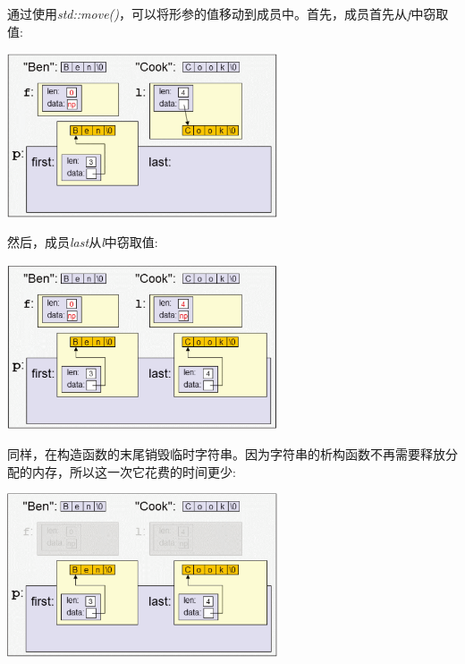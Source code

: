 通过使用\textit{std::move()}，可以将形参的值移动到成员中。首先，成员首先从\textit{f}中窃取值:\par

\begin{center}
	\includegraphics[width=0.6\textwidth]{content/1/chapter4/images/5}
\end{center}

然后，成员\textit{last}从\textit{l}中窃取值:\par

\begin{center}
	\includegraphics[width=0.6\textwidth]{content/1/chapter4/images/6}
\end{center}

同样，在构造函数的末尾销毁临时字符串。因为字符串的析构函数不再需要释放分配的内存，所以这一次它花费的时间更少:\par

\begin{center}
	\includegraphics[width=0.6\textwidth]{content/1/chapter4/images/7}
\end{center}

